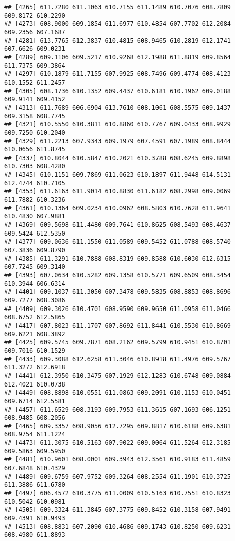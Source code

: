 \documentclass[
]{article}
\begin{document}
\begin{verbatim}
## [4265] 611.7280 611.1063 610.7155 611.1489 610.7076 608.7809 609.8172 610.2290
## [4273] 608.9000 609.1854 611.6977 610.4854 607.7702 612.2084 609.2356 607.1687
## [4281] 613.7765 612.3837 610.4815 608.9465 610.2819 612.1741 607.6626 609.0231
## [4289] 609.1106 609.5217 610.9268 612.1988 611.8819 609.8564 611.7375 609.3864
## [4297] 610.1879 611.7155 607.9925 608.7496 609.4774 608.4123 610.1552 611.2457
## [4305] 608.1736 610.1352 609.4437 610.6181 610.1962 609.0188 609.9141 609.4152
## [4313] 611.7689 606.6904 613.7610 608.1061 608.5575 609.1437 609.3158 608.7745
## [4321] 610.5550 610.3811 610.8860 610.7767 609.0433 608.9929 609.7250 610.2040
## [4329] 611.2213 607.9343 609.1979 607.4591 607.1989 608.8444 610.0656 611.8745
## [4337] 610.8044 610.5847 610.2021 610.3788 608.6245 609.8898 610.7303 608.4280
## [4345] 610.1151 609.7869 611.0623 610.1897 611.9448 614.5131 612.4744 610.7105
## [4353] 611.6163 611.9014 610.8830 611.6182 608.2998 609.0069 611.7882 610.3236
## [4361] 610.1364 609.0234 610.0962 608.5803 610.7628 611.9641 610.4830 607.9881
## [4369] 609.5698 611.4480 609.7641 610.8625 608.5493 608.4637 609.5424 612.5350
## [4377] 609.0636 611.1550 611.0589 609.5452 611.0788 608.5740 607.3836 609.8790
## [4385] 611.3291 610.7888 608.8319 609.8588 610.6030 612.6315 607.7245 609.3140
## [4393] 607.0634 610.5282 609.1358 610.5771 609.6509 608.3454 610.3944 606.6314
## [4401] 609.1037 611.3050 607.3478 609.5835 608.8853 608.8696 609.7277 608.3086
## [4409] 609.3026 610.4701 608.9590 609.9650 611.0958 611.0466 608.6752 612.5865
## [4417] 607.8023 611.1707 607.8692 611.8441 610.5530 610.8669 609.6221 608.3892
## [4425] 609.5745 609.7871 608.2162 609.5799 610.9451 610.8701 609.7016 610.1529
## [4433] 609.3088 612.6258 611.3046 610.8918 611.4976 609.5767 611.3272 612.6918
## [4441] 612.3950 610.3475 607.1929 612.1283 610.6748 609.0884 612.4021 610.0738
## [4449] 608.8898 610.0551 611.0863 609.2091 610.1153 610.0451 609.6714 612.5581
## [4457] 611.6529 608.3193 609.7953 611.3615 607.1693 606.1251 608.9485 608.2056
## [4465] 609.3357 608.9056 612.7295 609.8817 610.6188 609.6381 608.9754 611.1224
## [4473] 611.3075 610.5163 607.9022 609.0064 611.5264 612.3185 609.5863 609.5950
## [4481] 610.9601 608.0001 609.3943 612.3561 610.9183 611.4859 607.6848 610.4329
## [4489] 609.6759 607.9752 609.3264 608.2554 611.1901 610.3725 611.3886 611.6780
## [4497] 606.4572 610.3775 611.0009 610.5163 610.7551 610.8323 610.5042 610.0981
## [4505] 609.3324 611.3845 607.3775 609.8452 610.3158 607.9491 609.4391 610.9493
## [4513] 608.8831 607.2090 610.4686 609.1743 610.8250 609.6231 608.4980 611.8893

\end{verbatim}
\end{document}
